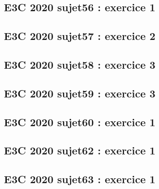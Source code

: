 \documentclass[lang=fr,edition=teacher,layout=sheet]{mxbook}
\begin{document}
\par\bigskip
{}\subsection*{E3C 2020 sujet56 : exercice 1}
\begingroup\endgroup
\par\bigskip
{}\subsection*{E3C 2020 sujet57 : exercice 2}
\begingroup\endgroup
\par\bigskip
{}\subsection*{E3C 2020 sujet58 : exercice 3}
\begingroup\endgroup
\par\bigskip
{}\subsection*{E3C 2020 sujet59 : exercice 3}
\begingroup\endgroup
\par\bigskip
{}\subsection*{E3C 2020 sujet60 : exercice 1}
\begingroup\endgroup
\par\bigskip
{}\subsection*{E3C 2020 sujet62 : exercice 1}
\begingroup\endgroup
\par\bigskip
{}\subsection*{E3C 2020 sujet63 : exercice 1}
\begingroup\endgroup
\par\bigskip
\end{document}
